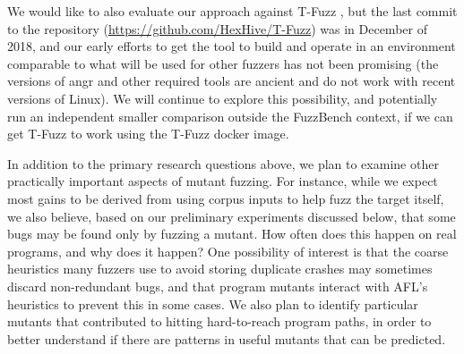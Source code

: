 We would like to also evaluate our approach against T-Fuzz \cite{tfuzz}, but the last commit to the repository (\url{https://github.com/HexHive/T-Fuzz}) was in December of 2018, and our early efforts to get the tool to build and operate in an environment comparable to what will be used for other fuzzers has not been promising (the versions of angr and other required tools are ancient and do not work with recent versions of Linux).  We will continue to explore this possibility, and potentially run an independent smaller comparison outside the FuzzBench context, if we can get T-Fuzz to work using the T-Fuzz docker image.

In addition to the primary research questions above, we plan to
examine other practically important aspects of mutant fuzzing.  For
instance, while we expect most gains to be derived from using corpus
inputs to help fuzz the target itself, we also believe, based on our
preliminary experiments discussed below, that some bugs may be found
only by fuzzing a mutant.  How often does this happen on real
programs, and why does it happen?  One possibility of interest is that the coarse heuristics many fuzzers use to avoid storing duplicate crashes \cite{semantic-crash-bucketing,mdebug} may sometimes discard non-redundant bugs, and that program mutants interact with AFL's heuristics to prevent this in some cases.  We also plan to identify particular mutants that contributed to hitting hard-to-reach program paths, in order to better understand if there are patterns in useful mutants that can be predicted.
